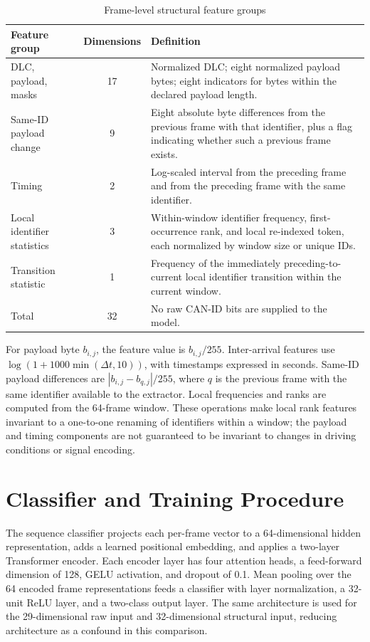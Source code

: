 \documentclass[12pt, a4paper, reqno, oneside]{book}
\begin{document}
\begin{table}[htbp]
\centering
\caption{Frame-level structural feature groups}
\label{tab:struct_features}
\renewcommand{\arraystretch}{1.15}
\begin{tabular}{p{3.6cm} c p{7.2cm}}
\hline
\textbf{Feature group} & \textbf{Dimensions} & \textbf{Definition} \\
\hline
DLC, payload, masks & 17 & Normalized DLC; eight normalized payload bytes; eight indicators for bytes within the declared payload length. \\
Same-ID payload change & 9 & Eight absolute byte differences from the previous frame with that identifier, plus a flag indicating whether such a previous frame exists. \\
Timing & 2 & Log-scaled interval from the preceding frame and from the preceding frame with the same identifier. \\
Local identifier statistics & 3 & Within-window identifier frequency, first-occurrence rank, and local re-indexed token, each normalized by window size or unique IDs. \\
Transition statistic & 1 & Frequency of the immediately preceding-to-current local identifier transition within the current window. \\
\hline
Total & 32 & No raw CAN-ID bits are supplied to the model. \\
\hline
\end{tabular}
\end{table}

For payload byte $b_{i,j}$, the feature value is $b_{i,j}/255$. Inter-arrival features use $\log(1 + 1000\min(\Delta t,10))$, with timestamps expressed in seconds. Same-ID payload differences are $|b_{i,j}-b_{q,j}|/255$, where $q$ is the previous frame with the same identifier available to the extractor. Local frequencies and ranks are computed from the 64-frame window. These operations make local rank features invariant to a one-to-one renaming of identifiers within a window; the payload and timing components are not guaranteed to be invariant to changes in driving conditions or signal encoding.

\section{Classifier and Training Procedure}
\label{sec:method_model}
The sequence classifier projects each per-frame vector to a 64-dimensional hidden representation, adds a learned positional embedding, and applies a two-layer Transformer encoder. Each encoder layer has four attention heads, a feed-forward dimension of 128, GELU activation, and dropout of 0.1. Mean pooling over the 64 encoded frame representations feeds a classifier with layer normalization, a 32-unit ReLU layer, and a two-class output layer. The same architecture is used for the 29-dimensional raw input and 32-dimensional structural input, reducing architecture as a confound in this comparison.
\end{document}
